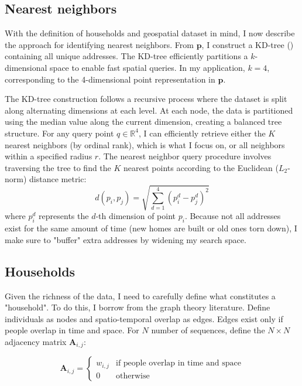 \documentclass[main.tex]{subfiles}
\begin{document}
\subsection{Nearest neighbors}
With the definition of households and geospatial dataset in mind, I now describe the approach for identifying nearest neighbors. From $\mathbf{p}$, I construct a KD-tree (\textcite{bentley1975multidimensional}) containing all unique addresses. The KD-tree efficiently partitions a $k$-dimensional space to enable fast spatial queries. In my application, $k=4$, corresponding to the 4-dimensional point representation in $\mathbf{p}$.

The KD-tree construction follows a recursive process where the dataset is split along alternating dimensions at each level. At each node, the data is partitioned using the median value along the current dimension, creating a balanced tree structure. For any query point $q \in \mathbb{R}^4$, I can efficiently retrieve either the $K$ nearest neighbors (by ordinal rank), which is what I focus on, or all neighbors within a specified radius $r$. 
The nearest neighbor query procedure involves traversing the tree to find the $K$ nearest points according to the Euclidean ($L_2$-norm) distance metric:
\begin{equation}
d(p_i, p_j) = \sqrt{\sum_{d=1}^{4} (p_i^d - p_j^d)^2}
\end{equation}
where $p_i^d$ represents the $d$-th dimension of point $p_i$. Because not all addresses exist for the same amount of time (new homes are built or old ones torn down), I make sure to "buffer" extra addresses by widening my search space. 

\subsection{Households}
Given the richness of the data, I need to carefully define what constitutes a "household". To do this, I borrow from the graph theory literature. Define individuals as nodes and spatio-temporal overlap as edges. Edges exist only if people overlap in time and space. For $N$ number of sequences, define the $N \times N$ adjacency matrix $\mathbf{A}_{i,j}$:

\begin{equation}
    \mathbf{A}_{i,j} = \begin{cases}
        w_{i,j} & \text{if people overlap in time and space} \\
        0 & \text{otherwise}
    \end{cases}
\end{equation}
\end{document}
